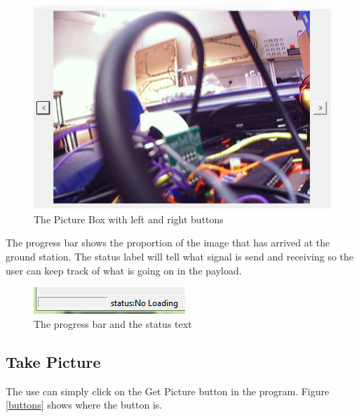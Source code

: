 \documentclass[a4paper,11pt]{article}
\begin{document}
\begin{figure}[!htbp]
\begin{center}
\includegraphics[scale=1]{leftRight.PNG}   
\caption{The Picture Box with left and right buttons \label{leftRight}}
\end{center}
\end{figure}

The progress bar shows the proportion of the image that has arrived at the ground station. The status label will tell what signal is send and receiving so the user can keep track of what is going on in the payload.

\begin{figure}[!htbp]
\begin{center}
\includegraphics[scale=1]{progress_bar.PNG} 
\caption{The progress bar and the status text \label{progressBar}}
\end{center}
\end{figure}

\subsection{Take Picture}

The use can simply click on the Get Picture button in the program. Figure \ref{buttons} shows where the button is.
\end{document}
